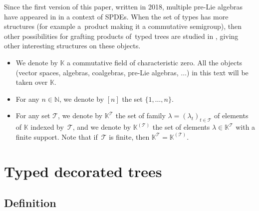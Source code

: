 \documentclass[pdftex]{sigma}
\numberwithin{equation}{section}
\newcommand{\K}{\mathbb{K}}
\newcommand{\T}{\mathcal{T}}
\begin{document}
Since the first version of this paper, written in 2018, multiple pre-Lie algebras have appeared in
\cite{BCCH,BrunedManchon} in a context of SPDEs. When the set of types has more structures (for example a~product
making it a commutative semigroup), then other possibilities for grafting products of~typed trees
are studied in \cite{FoissyPrelie2,ManchonZhang,GaoGuoZhang}, giving other interesting structures on these objects.

\begin{Notation}\qquad
\begin{itemize}\itemsep=0pt
\item We denote by $\K$ a commutative field of characteristic zero. All the objects (vector spaces, algebras,
 coalgebras, pre-Lie algebras, $\dots$)
in this text will be taken over $\K$.
\item For any $n\in \mathbb{N}$, we denote by $[n]$ the set $\{1,\dots,n\}$.
\item For any set $\T$, we denote by $\K^\T$ the set of family $\lambda=(\lambda_t)_{t\in \T}$ of elements of $\K$
indexed by~$\T$, and we denote by $\K^{(\T)}$ the set of elements $\lambda\in \K^\T$ with a finite support.
Note that if~$\T$ is finite, then $\K^\T=\K^{(\T)}$.
\end{itemize}
\end{Notation}

\section{Typed decorated trees}

\subsection{Definition}
\end{document}
